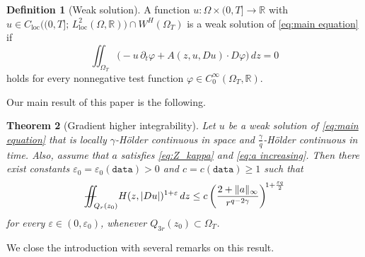 \documentclass[notitlepage,11pt,reqno]{amsart}
\newtheorem{theorem}{Theorem}[section]
\theoremstyle{definition}
\newtheorem{definition}[theorem]{Definition}
\numberwithin{equation}{section}
\newcommand{\RR}{\mathds{R}}
\newcommand{\iintss}{{\int\hspace{-0.28cm}\int}}
\newcommand{ \miints }{{\iintss\hspace{-0.56cm} -\hspace{-0.15cm}-}}
\newcommand{\miint}[1]{{\miints_{\hspace{-0.13cm}#1}}}
\begin{document}
\begin{definition}[Weak solution]\label{def:weak_solution}
A function $u : \Omega \times (0, T] \to \RR$ with
$u \in C_{\mathrm{loc}}\!\bigl((0, T];\, L^2_{\mathrm{loc}}(\Omega, \RR)\bigr)
\cap W^H(\Omega_T)$ is a weak solution of \eqref{eq:main equation} if
\[
  \iint_{\Omega_T} \bigl(- u\, \partial_t \varphi + A(z, u, Du) \cdot D\varphi\bigr) \, dz = 0
\]
holds for every nonnegative test function $\varphi \in C^{\infty}_0(\Omega_T, \RR)$.
\end{definition}
Our main result of this paper is the following.
\begin{theorem}[Gradient higher integrability]\label{main theorem}
Let $u$ be a weak solution of \eqref{eq:main equation} that is locally $\gamma$-H\"older continuous in space and $\frac{\gamma}{q}$-H\"older continuous in time. Also, assume that $a$ satisfies \eqref{eq:Z_kappa} and \eqref{eq:a increasing}. Then there exist constants $\varepsilon_0 = \varepsilon_0(\texttt{data}) > 0$
and $c = c(\texttt{data}) \ge 1$ such that
\[
  \miint{Q_r(z_0)} H(z, |Du|)^{1+\varepsilon} \, dz
  \le c \left( \frac{2 + \|a\|_\infty}{r^{q - 2\gamma}} \right)^{\! 1 + \frac{\varepsilon q}{2}}
\]
for every $\varepsilon \in (0, \varepsilon_0)$, whenever $Q_{3r}(z_0) \subset \Omega_T$.
\end{theorem}

We close the introduction with several remarks on this result.
\end{document}
